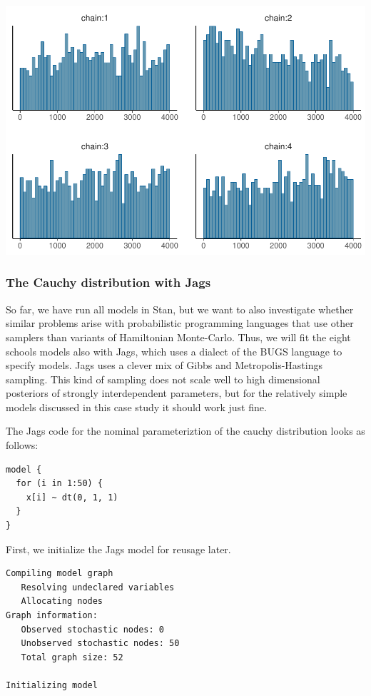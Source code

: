 \documentclass[american,]{article}
\begin{document}
\includegraphics{graphics/hist-fit-half-reparam-lp-1.pdf}

\hypertarget{the-cauchy-distribution-with-jags}{%
\subsubsection*{The Cauchy distribution with
Jags}\label{the-cauchy-distribution-with-jags}}

So far, we have run all models in Stan, but we want to also investigate
whether similar problems arise with probabilistic programming languages
that use other samplers than variants of Hamiltonian Monte-Carlo. Thus,
we will fit the eight schools models also with Jags, which uses a
dialect of the BUGS language to specify models. Jags uses a clever mix
of Gibbs and Metropolis-Hastings sampling. This kind of sampling does
not scale well to high dimensional posteriors of strongly interdependent
parameters, but for the relatively simple models discussed in this case
study it should work just fine.

The Jags code for the nominal parameteriztion of the cauchy distribution
looks as follows:

\begin{verbatim}
model {
  for (i in 1:50) {
    x[i] ~ dt(0, 1, 1)
  }
}
\end{verbatim}

First, we initialize the Jags model for reusage later.

\begin{verbatim}
Compiling model graph
   Resolving undeclared variables
   Allocating nodes
Graph information:
   Observed stochastic nodes: 0
   Unobserved stochastic nodes: 50
   Total graph size: 52

Initializing model
\end{verbatim}
\end{document}

